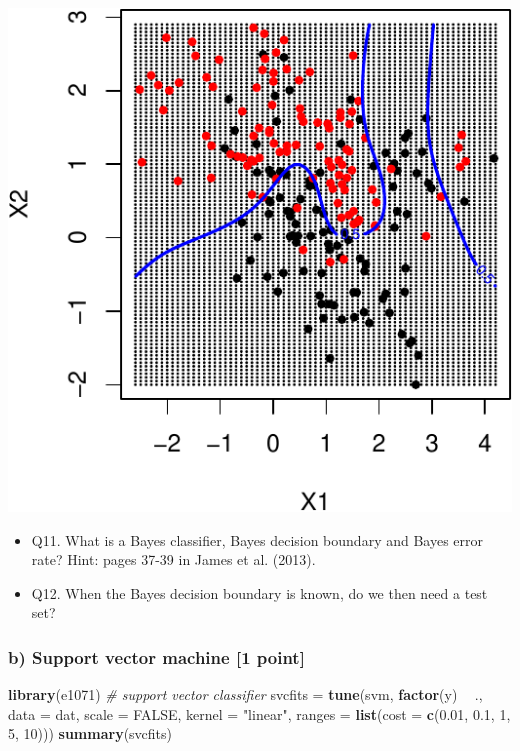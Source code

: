 \documentclass[]{article}
\newenvironment{Shaded}{\begin{snugshade}}{\end{snugshade}}
\newcommand{\CommentTok}[1]{\textcolor[rgb]{0.56,0.35,0.01}{\textit{#1}}}
\newcommand{\DataTypeTok}[1]{\textcolor[rgb]{0.13,0.29,0.53}{#1}}
\newcommand{\DecValTok}[1]{\textcolor[rgb]{0.00,0.00,0.81}{#1}}
\newcommand{\FloatTok}[1]{\textcolor[rgb]{0.00,0.00,0.81}{#1}}
\newcommand{\KeywordTok}[1]{\textcolor[rgb]{0.13,0.29,0.53}{\textbf{#1}}}
\newcommand{\NormalTok}[1]{#1}
\newcommand{\OperatorTok}[1]{\textcolor[rgb]{0.81,0.36,0.00}{\textbf{#1}}}
\newcommand{\OtherTok}[1]{\textcolor[rgb]{0.56,0.35,0.01}{#1}}
\newcommand{\StringTok}[1]{\textcolor[rgb]{0.31,0.60,0.02}{#1}}
\providecommand{\tightlist}{%
  \setlength{\itemsep}{0pt}\setlength{\parskip}{0pt}}
\begin{document}
\includegraphics{9SVM_files/figure-latex/unnamed-chunk-30-1.pdf}

\begin{itemize}
\tightlist
\item
  Q11. What is a Bayes classifier, Bayes decision boundary and Bayes
  error rate? Hint: pages 37-39 in James et al. (2013).
\item
  Q12. When the Bayes decision boundary is known, do we then need a test
  set?
\end{itemize}

\hypertarget{b-support-vector-machine-1-point}{%
\subsubsection{b) Support vector machine {[}1
point{]}}\label{b-support-vector-machine-1-point}}

\begin{Shaded}
\begin{Highlighting}[]
\KeywordTok{library}\NormalTok{(e1071)}
\CommentTok{# support vector classifier}
\NormalTok{svcfits =}\StringTok{ }\KeywordTok{tune}\NormalTok{(svm, }\KeywordTok{factor}\NormalTok{(y) }\OperatorTok{~}\StringTok{ }\NormalTok{., }\DataTypeTok{data =}\NormalTok{ dat, }\DataTypeTok{scale =} \OtherTok{FALSE}\NormalTok{, }\DataTypeTok{kernel =} \StringTok{"linear"}\NormalTok{, }
    \DataTypeTok{ranges =} \KeywordTok{list}\NormalTok{(}\DataTypeTok{cost =} \KeywordTok{c}\NormalTok{(}\FloatTok{0.01}\NormalTok{, }\FloatTok{0.1}\NormalTok{, }\DecValTok{1}\NormalTok{, }\DecValTok{5}\NormalTok{, }\DecValTok{10}\NormalTok{)))}
\KeywordTok{summary}\NormalTok{(svcfits)}
\end{Highlighting}
\end{Shaded}
\end{document}
